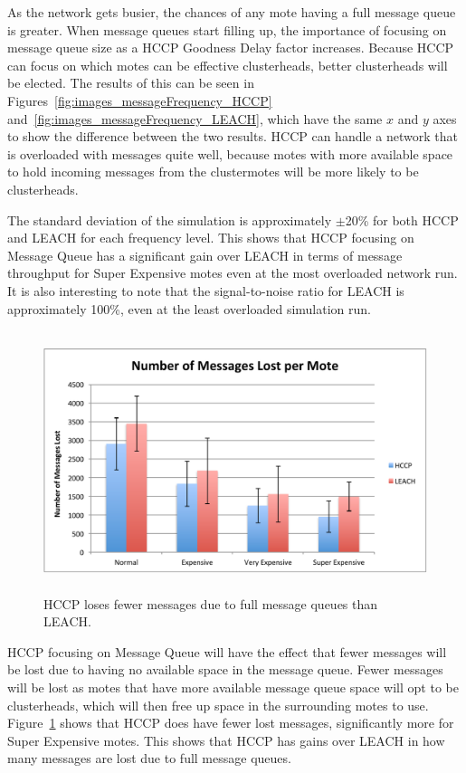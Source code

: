 As the network gets busier, the chances of any mote having a full message queue is greater. When message queues
start filling up, the importance of focusing on message queue size as a HCCP Goodness Delay factor increases. 
Because HCCP can focus on which motes can be effective clusterheads, better clusterheads will be elected.
The results of this can be seen in Figures~\ref{fig:images_messageFrequency_HCCP} and~\ref{fig:images_messageFrequency_LEACH}, which 
have the same $x$ and $y$ axes to show the difference between the two results.
HCCP can handle a network that is overloaded with messages quite well, because motes with more
available space to hold incoming messages from the clustermotes will be more likely to be clusterheads.

The standard deviation of the simulation is approximately $\pm$20\% for both HCCP and LEACH for each
frequency level. This shows that HCCP focusing on Message Queue has a significant gain over LEACH
in terms of message throughput for Super Expensive motes even at the most overloaded network run. It is 
also interesting to note that the signal-to-noise ratio for LEACH is approximately 100\%, even 
at the least overloaded simulation run.


\begin{figure}[htbp]
    \centering
        \includegraphics[height=3in]{images/messageFrequency/MessagesLost.pdf}
    \caption{HCCP loses fewer messages due to full message queues than LEACH.}
    \label{fig:images_messageFrequency_MessagesLost}
\end{figure}

HCCP focusing on Message Queue will have the effect that fewer messages 
will be lost due to having no available space in the message queue.
Fewer messages will be lost as motes that have more available message queue space will opt
to be clusterheads, which will then free up space in the surrounding motes to use.
Figure~\ref{fig:images_messageFrequency_MessagesLost} shows that HCCP does 
have fewer lost messages, significantly more for Super Expensive motes. 
This shows that HCCP has gains over LEACH in how many messages are lost due to 
full message queues.

